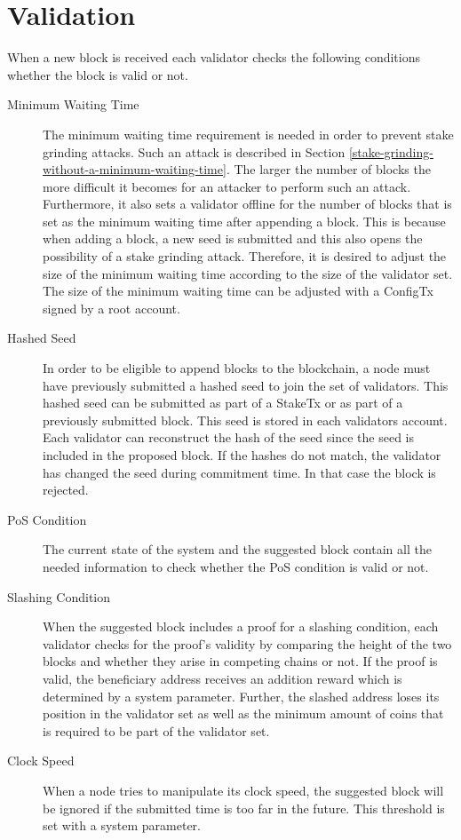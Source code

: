\section{Validation}\label{validation}
When a new block is received each validator checks the following conditions whether the block is valid or not.
\begin{description}
	\item[Minimum Waiting Time] The minimum waiting time requirement is needed in order to prevent stake grinding attacks. Such an attack is described in Section \ref{stake-grinding-without-a-minimum-waiting-time}. The larger the number of blocks the more difficult it becomes for an attacker to perform such an attack. Furthermore, it also sets a validator offline for the number of blocks that is set as the minimum waiting time after appending a block. This is because when adding a block, a new seed is submitted and this also opens the possibility of a stake grinding attack. Therefore, it is desired to adjust the size of the minimum waiting time according to the size of the validator set. The size of the minimum waiting time can be adjusted with a ConfigTx signed by a root account.
	\item[Hashed Seed] In order to be eligible to append blocks to the blockchain, a node must have previously submitted a hashed seed to join the set of validators. This hashed seed can be submitted as part of a StakeTx or as part of a previously submitted block. This seed is stored in each validators account. Each validator can reconstruct the hash of the seed since the seed is included in the proposed block. If the hashes do not match, the validator has changed the seed during commitment time. In that case the block is rejected.
	\item[PoS Condition] The current state of the system and the suggested block contain all the needed information to check whether the PoS condition is valid or not.
	\item[Slashing Condition] When the suggested block includes a proof for a slashing condition, each validator checks for the proof's validity by comparing the height of the two blocks and whether they arise in competing chains or not. If the proof is valid, the beneficiary address receives an addition reward which is determined by a system parameter. Further, the slashed address loses its position in the validator set as well as the minimum amount of coins that is required to be part of the validator set.
	\item[Clock Speed] When a node tries to manipulate its clock speed, the suggested block will be ignored if the submitted time is too far in the future. This threshold is set with a system parameter.
\end{description}

